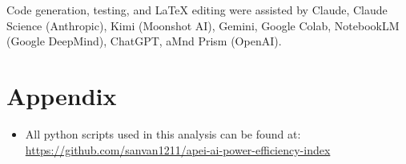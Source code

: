 \documentclass[11pt]{article}
\begin{document}
Code generation, testing, and LaTeX editing were assisted by Claude, Claude Science (Anthropic), Kimi (Moonshot AI), Gemini, Google Colab, NotebookLM (Google DeepMind), ChatGPT, aMnd Prism (OpenAI).


\newpage
\section*{Appendix}

\begin{itemize}
  \item All python scripts used in this analysis can be found at: \\ \url{https://github.com/sanvan1211/apei-ai-power-efficiency-index}
\end{itemize}

\vspace{1em}
\listoffigures
\vspace{1em}
\listoftables
\end{document}
